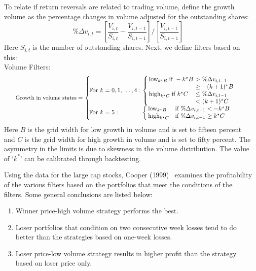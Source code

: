 To relate if return reversals are related to trading volume, define the growth volume as the percentage changes in volume adjusted for the outstanding shares: 
	\begin{equation}\label{eqn:perdeltav}
	\%\Delta v_{i,t} = \left[\frac{V_{i,t}}{S_{i,t}}-\frac{V_{i,t-1}}{S_{i,t-1}}\right] / \left[\frac{V_{i,t-1}}{S_{i,t-1}}\right]
	\end{equation}
Here $S_{i,t}$ is the number of outstanding shares. Next, we define filters based on this: \\


\noindent Volume Filters: 
	\begin{equation}\label{eqn:volfilter}
	\scalebox{0.89}{$\textrm{\small Growth in volume states} = \left\{ 
	\begin{array}{lllll}
		\!\!\!\!\textrm{For} ~k = 0,1,\ldots,4: & \!\!\!\!\left\{ 
			\begin{array}{lllll}
			\!\!\!\! \textrm{  low}_{k^\star B}\;  \textrm{if } -k^\star B &\!\!\!\!>\!\!\!\! & \!\!\!\! \%\Delta v_{i,t-1} \\
			\!\!\!\!& \!\!\!\!\geq & \!\!\!\!- (k+1)^\star B \\
	\!\!\!\! \textrm{ high}_{k^\star C}\; \textrm{if } k^\star C & \!\!\!\!\leq&\!\!\!\! \%\Delta v_{i,t-1} \\
	&\!\!\!\!<&\!\!\!\!  (k+1)^\star C
			\end{array}
		\right.\\
		\!\!\!\!\textrm{For} ~k = 5: & \!\!\!\!\left\{
		 \begin{array}{ll}
		 \!\!\!\! \textrm{ low}_{k^\star B} & \textrm{if} ~\%\Delta v_{i,t-1} <-k^\star B \\
		 \!\!\!\! \textrm{ high}_{k^\star C} & \textrm{if}  ~\%\Delta v_{i,t-1} \geq  k^\star C
		 	\end{array} \right.
		\end{array} \right. $}
	\end{equation} 
Here $B$ is the grid width for low growth in volume and is set to fifteen percent and $C$ is the grid width for high growth in volume and is set to fifty percent. The asymmetry in the limits is due to skewness in the volume distribution. The value of `$k^*$' can be calibrated through backtesting. 


Using the data for the large cap stocks, Cooper (1999)~\cite{cooper} examines the profitability of the various filters based on the portfolios that meet the conditions of the filters. Some general conclusions are listed below:
	\begin{enumerate}[--]
	\item Winner price-high volume strategy performs the best.
	\item Loser portfolios that condition on two consecutive week losses tend to do better than the strategies based on one-week losses.
	\item Loser price-low volume strategy results in higher profit than the strategy based on loser price only.
	\end{enumerate}



